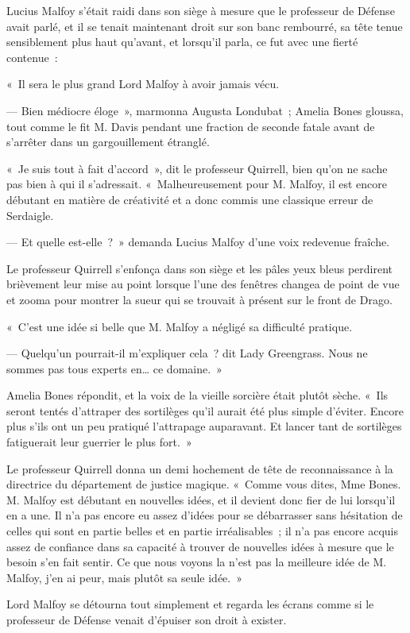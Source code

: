 Lucius Malfoy s'était raidi dans son siège à mesure que le professeur de Défense avait parlé, et il se tenait maintenant droit sur son banc rembourré, sa tête tenue sensiblement plus haut qu'avant, et lorsqu'il parla, ce fut avec une fierté contenue~:

«~Il sera le plus grand Lord Malfoy à avoir jamais vécu.

--- Bien médiocre éloge~», marmonna Augusta Londubat~; Amelia Bones gloussa, tout comme le fit M. Davis pendant une fraction de seconde fatale avant de s'arrêter dans un gargouillement étranglé.

«~Je suis tout à fait d'accord~», dit le professeur Quirrell, bien qu'on ne sache pas bien à qui il s'adressait.
«~Malheureusement pour M. Malfoy, il est encore débutant en matière de créativité et a donc commis une classique erreur de Serdaigle.

--- Et quelle est-elle~?~»
demanda Lucius Malfoy d'une voix redevenue fraîche.

Le professeur Quirrell s'enfonça dans son siège et les pâles yeux bleus perdirent brièvement leur mise au point lorsque l'une des fenêtres changea de point de vue et zooma pour montrer la sueur qui se trouvait à présent sur le front de Drago.

«~C'est une idée si belle que M. Malfoy a négligé sa difficulté pratique.

--- Quelqu'un pourrait-il m'expliquer cela~? dit Lady Greengrass.
Nous ne sommes pas tous experts en… ce domaine.~»

Amelia Bones répondit, et la voix de la vieille sorcière était plutôt sèche.
«~Ils seront tentés d'attraper des sortilèges qu'il aurait été plus simple d'éviter.
Encore plus s'ils ont un peu pratiqué l'attrapage auparavant.
Et lancer tant de sortilèges fatiguerait leur guerrier le plus fort.~»

Le professeur Quirrell donna un demi hochement de tête de reconnaissance à la directrice du département de justice magique.
«~Comme vous dites, Mme Bones.
M. Malfoy est débutant en nouvelles idées, et il devient donc fier de lui lorsqu'il en a une.
Il n'a pas encore eu assez d'idées pour se débarrasser sans hésitation de celles qui sont en partie belles et en partie irréalisables~; il n'a pas encore acquis assez de confiance dans sa capacité à trouver de nouvelles idées à mesure que le besoin s'en fait sentir.
Ce que nous voyons la n'est pas la meilleure idée de M. Malfoy, j'en ai peur, mais plutôt sa seule idée.~»

Lord Malfoy se détourna tout simplement et regarda les écrans comme si le professeur de Défense venait d'épuiser son droit à exister.

